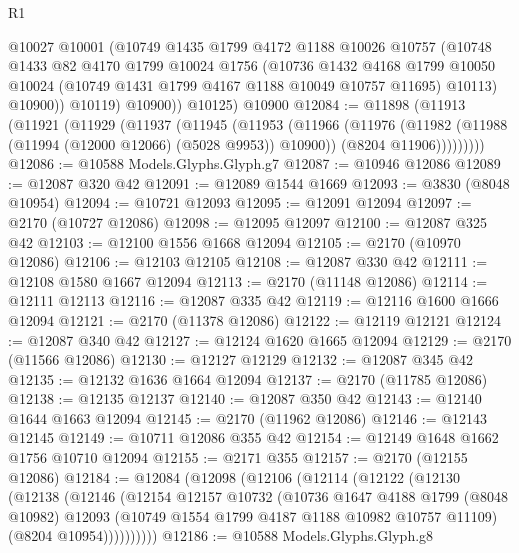 \begin{lexlean}{R1}
\begin{coremodule}
            @10027
            @10001
            (@10749
              @1435
              @1799
              @4172
              @1188
              @10026
              @10757
              (@10748
                @1433
                @82
                @4170
                @1799
                @10024
                @1756
                (@10736
                  @1432
                  @4168
                  @1799
                  @10050
                  @10024
                  (@10749 @1431 @1799 @4167 @1188 @10049 @10757 @11695)
                  @10113)
                @10900))
            @10119)
          @10900))
      @10125)
    @10900
@12084 := @11898
    (@11913
      (@11921
        (@11929
          (@11937
            (@11945
              (@11953
                (@11966
                  (@11976
                    (@11982 (@11988 (@11994 (@12000 @12066) (@5028 @9953)) @10900))
                    (@8204 @11906)))))))))
@12086 := @10588 Models.Glyphs.Glyph.g7
@12087 := @10946 @12086
@12089 := @12087 @320 @42
@12091 := @12089 @1544 @1669
@12093 := @3830 (@8048 @10954)
@12094 := @10721 @12093
@12095 := @12091 @12094
@12097 := @2170 (@10727 @12086)
@12098 := @12095 @12097
@12100 := @12087 @325 @42
@12103 := @12100 @1556 @1668 @12094
@12105 := @2170 (@10970 @12086)
@12106 := @12103 @12105
@12108 := @12087 @330 @42
@12111 := @12108 @1580 @1667 @12094
@12113 := @2170 (@11148 @12086)
@12114 := @12111 @12113
@12116 := @12087 @335 @42
@12119 := @12116 @1600 @1666 @12094
@12121 := @2170 (@11378 @12086)
@12122 := @12119 @12121
@12124 := @12087 @340 @42
@12127 := @12124 @1620 @1665 @12094
@12129 := @2170 (@11566 @12086)
@12130 := @12127 @12129
@12132 := @12087 @345 @42
@12135 := @12132 @1636 @1664 @12094
@12137 := @2170 (@11785 @12086)
@12138 := @12135 @12137
@12140 := @12087 @350 @42
@12143 := @12140 @1644 @1663 @12094
@12145 := @2170 (@11962 @12086)
@12146 := @12143 @12145
@12149 := @10711 @12086 @355 @42
@12154 := @12149 @1648 @1662 @1756 @10710 @12094
@12155 := @2171 @355
@12157 := @2170 (@12155 @12086)
@12184 := @12084
    (@12098
      (@12106
        (@12114
          (@12122
            (@12130
              (@12138
                (@12146
                  (@12154
                    @12157
                    @10732
                    (@10736
                      @1647
                      @4188
                      @1799
                      (@8048 @10982)
                      @12093
                      (@10749 @1554 @1799 @4187 @1188 @10982 @10757 @11109)
                      (@8204 @10954))))))))))
@12186 := @10588 Models.Glyphs.Glyph.g8

\end{coremodule}
\end{lexlean}
